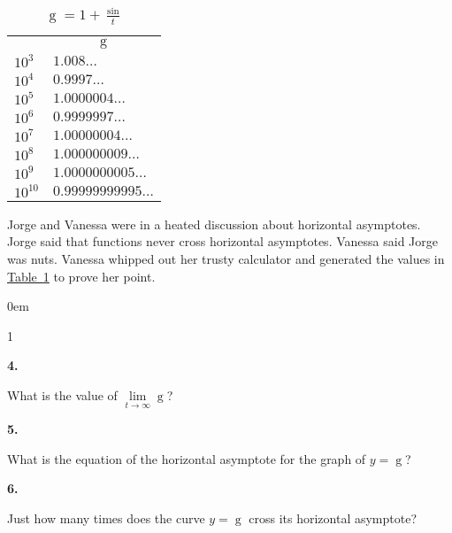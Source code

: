 \documentclass[12pt,]{book}
\theoremstyle{plain}
\theoremstyle{definition}
\numberwithin{equation}{section}
\newcommand{\hrulemedium}{\noalign{\hrule height 0.07em}}
\newcommand{\hrulethick} {\noalign{\hrule height 0.11em}}
\newenvironment{exercisegroup}%
{\medskip\noindent}%
{\par\bigskip}%
\newlength{\exercisegroupindent}%
\newlength{\exercisegroupitemwidth}%
\newenvironment{exercisegrouplist}%
{\vspace{-\partopsep}%
\begin{adjustwidth}{\exercisegroupindent}{0em}}%
{\end{adjustwidth}%
\vspace{-\partopsep}%
\vspace{\baselineskip}}%
\newenvironment{exercisegroupbycol}[1]%
{\begin{exercisegrouplist}%
\vspace{-\multicolsep}%
\begin{multicols}{#1}%
\setlength{\parindent}{0em}%
\setlength{\exercisegroupitemwidth}{\linewidth}}%
{\end{multicols}%
\vspace{-\multicolsep}%
\end{exercisegrouplist}}%
\newenvironment{exercisegroupitem}[1]%
{\begin{minipage}[t]{\exercisegroupitemwidth}
\vspace{0pt}%
{\bfseries#1}%
\rule{0pt}{\baselineskip}}{\strut%
\end{minipage}%
\hspace{\columnsep}}%
\providecommand\phantomsection{}
\newcommand{\fe}[2]{\mathop{{#1}{\left(#2\right)}}}
\begin{document}
\begin{table}
\centering
\caption{\(\fe{g}{t}=1+\frac{\fe{\sin}{t}}{t}\)\label{table-limit-crossing-asymptote}}
\begin{tabular}{ll}\hrulethick
\multicolumn{1}{c}{\(t\)}&\multicolumn{1}{c}{\(\fe{g}{t}\)}\\\hrulemedium
\(10^3\)&\(1.008\ldots\)\\
\(10^4\)&\(0.9997\ldots\)\\
\(10^5\)&\(1.0000004\ldots\)\\
\(10^6\)&\(0.9999997\ldots\)\\
\(10^7\)&\(1.00000004\ldots\)\\
\(10^8\)&\(1.000000009\ldots\)\\
\(10^9\)&\(1.0000000005\ldots\)\\
\(10^{10}\)&\(0.99999999995\ldots\)
\end{tabular}
\end{table}
\begin{exercisegroup}%
Jorge and Vanessa were in a heated discussion about horizontal asymptotes. Jorge said that functions never cross horizontal asymptotes. Vanessa said Jorge was nuts. Vanessa whipped out her trusty calculator and generated the values in \hyperref[table-limit-crossing-asymptote]{Table~\ref*{table-limit-crossing-asymptote}} to prove her point.%
\begin{exercisegroupbycol}{1}%
\begin{exercisegroupitem}{4. }\phantomsection\hypertarget{exercise-66}{\null}
What is the value of \(\lim\limits_{t\to\infty}\fe{g}{t}\)?%
\end{exercisegroupitem}%
\par%
\begin{exercisegroupitem}{5. }\phantomsection\hypertarget{exercise-67}{\null}
What is the equation of the horizontal asymptote for the graph of \(y=\fe{g}{t}\)?%
\end{exercisegroupitem}%
\par%
\begin{exercisegroupitem}{6. }\phantomsection\hypertarget{exercise-68}{\null}
Just how many times does the curve \(y=\fe{g}{t}\) cross its horizontal asymptote?%
\end{exercisegroupitem}%
\par%
\end{exercisegroupbycol}%
\end{exercisegroup}%
\typeout{************************************************}
\typeout{************************************************}
\end{document}
